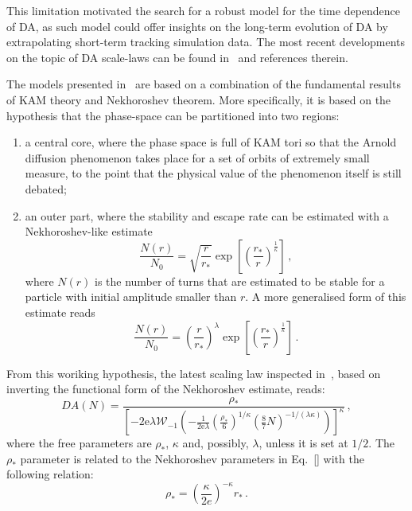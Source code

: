 This limitation motivated the search for a robust model for the time dependence of DA, as such model could offer insights on the long-term evolution of DA by extrapolating short-term tracking simulation data. The most recent developments on the topic of DA scale-laws can be found in~\cite{} and references therein.

The models presented in~\cite{} are based on a combination of the fundamental results of KAM theory and Nekhoroshev theorem. More specifically, it is based on the hypothesis that the phase-space can be partitioned into two regions: 
\begin{enumerate}
	\item a central core, where the phase space is full of KAM tori so that the Arnold diffusion phenomenon takes place for a set of orbits of extremely small measure, to the point that the physical value of the phenomenon itself is still debated;
	\item an outer part, where the stability and escape rate can be estimated with a Nekhoroshev-like estimate
	\begin{equation}
		\frac{N(r)}{N_0} = \sqrt{\frac{r}{r_\ast}} \exp\left[\left(\frac{r_\ast}{r}\right)^{\frac{1}{\kappa}}\right]\,,
	\end{equation}
	where \(N(r)\) is the number of turns that are estimated to be stable for a particle with initial amplitude smaller than \(r\). A more generalised form of this estimate reads
    \begin{equation}
        \frac{N(r)}{N_0} = \left(\frac{r}{r_\ast}\right)^{\lambda} \exp\left[\left(\frac{r_\ast}{r}\right)^{\frac{1}{\kappa}}\right]\,.
    \end{equation}
\end{enumerate}

From this woriking hypothesis, the latest scaling law inspected in~\cite{}, based on inverting the functional form of the Nekhoroshev estimate, reads:
\begin{equation}
	DA(N) = \frac{\rho_\ast}{\left[-2 \mathrm{e} \lambda \mathcal{W}_{-1}\left(-\frac{1}{2 \mathrm{e} \lambda}\left(\frac{\rho_*}{6}\right)^{1 / \kappa}\left(\frac{8}{7} N\right)^{-1 /(\lambda \kappa)}\right)\right]^\kappa}\,,
	\label{eq:giova_interpolation}
\end{equation}
where the free parameters are $\rho_\ast$, $\kappa$ and, possibly, $\lambda$, unless it is set at $1/2$. The $\rho_\ast$ parameter is related to the Nekhoroshev parameters in Eq.~\eqref{} with the following relation:
\begin{equation}
    \rho_\ast = \left(\frac{\kappa}{2e}\right)^{-\kappa} r_\ast \,.
\end{equation}

